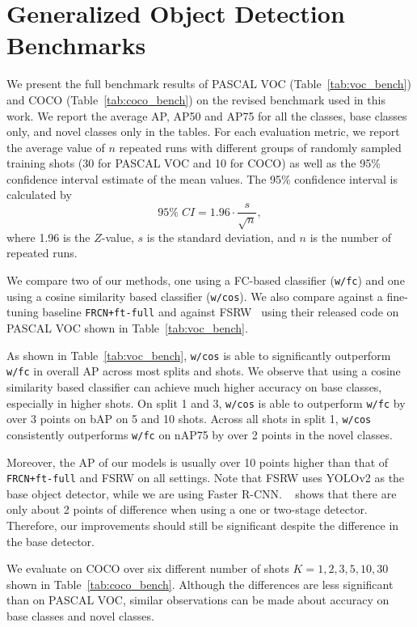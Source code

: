 \appendix
\section{Generalized Object Detection Benchmarks}
We present the full benchmark results of PASCAL VOC (Table~\ref{tab:voc_bench}) and COCO
(Table~\ref{tab:coco_bench}) on the revised benchmark used in this work. We report the average AP, AP50 and AP75 for all the classes, base classes only, and novel classes only in the tables. For each evaluation metric, we report the average value of $n$ repeated runs with different groups of randomly sampled training shots (30 for PASCAL VOC and 10 for COCO) as well as the 95\% confidence interval estimate of the mean values.  The 95\% confidence interval is calculated by 
\begin{equation}
    95\% \; CI = 1.96 \cdot \frac{s}{\sqrt{n}},
\end{equation}
where 1.96 is the $Z$-value, $s$ is the standard deviation, and $n$ is the number of repeated runs.

We compare two of our methods, one using a FC-based classifier (\texttt{\model w/fc}) and one using a cosine similarity based classifier (\texttt{\model w/cos}). We also compare against a fine-tuning baseline \texttt{FRCN+ft-full} and against FSRW~\cite{kang2019few} using their released code on PASCAL VOC shown in Table~\ref{tab:voc_bench}. 

As shown in Table~\ref{tab:voc_bench},
\texttt{\model w/cos} is able to significantly outperform \texttt{\model w/fc} in overall AP across most splits and shots.
We observe that using a cosine similarity based classifier can achieve much higher accuracy on base classes, especially in higher shots.
On split 1 and 3, \texttt{\model w/cos} is able to outperform \texttt{\model w/fc} by over 3 points on bAP on 5 and 10 shots.
Across all shots in split 1, \texttt{\model w/cos} consistently outperforms \texttt{\model w/fc} on nAP75 by over 2 points in the novel classes. 

Moreover, the AP of our models is usually over 10 points higher than that of \texttt{FRCN+ft-full} and FSRW on all settings. Note that FSRW uses YOLOv2 as the base object detector, while we are using Faster R-CNN. ~\citet{wang2019meta} shows that there are only about 2 points of difference when using a one or two-stage detector. Therefore, our improvements should still be significant despite the difference in the base detector.

We evaluate on COCO over six different number of shots $K=1,2,3,5,10,30$ shown in Table~\ref{tab:coco_bench}.
Although the differences are less significant than on PASCAL VOC, similar observations can be made about accuracy on base classes and novel classes.

